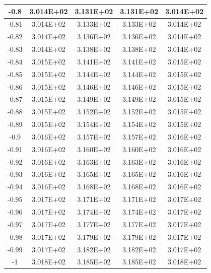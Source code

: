 \documentclass{article}
\begin{document}
\begin{center}
\begin{longtable}{|c|c|c|c|c|}
            -0.8 & 3.014E+02 & 3.131E+02 & 3.131E+02 & 3.014E+02 \\ \hline
            -0.81 & 3.014E+02 & 3.133E+02 & 3.133E+02 & 3.014E+02 \\ \hline
            -0.82 & 3.014E+02 & 3.136E+02 & 3.136E+02 & 3.014E+02 \\ \hline
            -0.83 & 3.014E+02 & 3.138E+02 & 3.138E+02 & 3.014E+02 \\ \hline
            -0.84 & 3.015E+02 & 3.141E+02 & 3.141E+02 & 3.015E+02 \\ \hline
            -0.85 & 3.015E+02 & 3.144E+02 & 3.144E+02 & 3.015E+02 \\ \hline
            -0.86 & 3.015E+02 & 3.146E+02 & 3.146E+02 & 3.015E+02 \\ \hline
            -0.87 & 3.015E+02 & 3.149E+02 & 3.149E+02 & 3.015E+02 \\ \hline
            -0.88 & 3.015E+02 & 3.152E+02 & 3.152E+02 & 3.015E+02 \\ \hline
            -0.89 & 3.015E+02 & 3.154E+02 & 3.154E+02 & 3.015E+02 \\ \hline
            -0.9 & 3.016E+02 & 3.157E+02 & 3.157E+02 & 3.016E+02 \\ \hline
            -0.91 & 3.016E+02 & 3.160E+02 & 3.160E+02 & 3.016E+02 \\ \hline
            -0.92 & 3.016E+02 & 3.163E+02 & 3.163E+02 & 3.016E+02 \\ \hline
            -0.93 & 3.016E+02 & 3.165E+02 & 3.165E+02 & 3.016E+02 \\ \hline
            -0.94 & 3.016E+02 & 3.168E+02 & 3.168E+02 & 3.016E+02 \\ \hline
            -0.95 & 3.017E+02 & 3.171E+02 & 3.171E+02 & 3.017E+02 \\ \hline
            -0.96 & 3.017E+02 & 3.174E+02 & 3.174E+02 & 3.017E+02 \\ \hline
            -0.97 & 3.017E+02 & 3.177E+02 & 3.177E+02 & 3.017E+02 \\ \hline
            -0.98 & 3.017E+02 & 3.179E+02 & 3.179E+02 & 3.017E+02 \\ \hline
            -0.99 & 3.017E+02 & 3.182E+02 & 3.182E+02 & 3.017E+02 \\ \hline
            -1 & 3.018E+02 & 3.185E+02 & 3.185E+02 & 3.018E+02 \\ \hline
        \end{longtable}
    \end{center}
\end{document}
